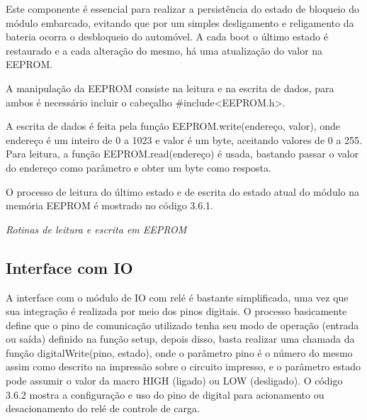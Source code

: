 Este componente é essencial para realizar a persistência do estado de bloqueio do módulo embarcado, evitando que por um simples desligamento e religamento da bateria ocorra o desbloqueio do automóvel. A cada boot o último estado é restaurado e a cada alteração do mesmo, há uma atualização do valor na EEPROM.

A manipulação da EEPROM consiste na leitura e na escrita de dados, para ambos é necessário incluir o cabeçalho \#include<EEPROM.h>. 

A escrita de dados é feita pela função EEPROM.write(endereço, valor), onde endereço é um inteiro de 0 a 1023 e valor é um byte, aceitando valores de 0 a 255. Para leitura, a função EEPROM.read(endereço) é usada, bastando passar o valor do endereço como parâmetro e obter um byte como resposta.

O processo de leitura do último estado e de escrita do estado atual do módulo na memória EEPROM é mostrado no código 3.6.1.

\renewcommand{\baselinestretch}{0.5}  %
\begin{codigo}[htb]
\fontsize{9pt}{9pt}\selectfont
      \begin{boxit}  %
      \vspace{2mm}
   \end{boxit}
   \caption{\it Rotinas de leitura e escrita em EEPROM}
   \label{code:eeprom}
\end{codigo}

\newpage

\subsection{Interface com IO}

A interface com o módulo de IO com relé é bastante simplificada, uma vez que sua integração é realizada por meio dos pinos digitais. O processo basicamente define que o pino de comunicação utilizado tenha seu modo de operação (entrada ou saída) definido na função setup, depois disso, basta realizar uma chamada da função digitalWrite(pino, estado), onde o parâmetro pino é o número do mesmo assim como descrito na impressão sobre o circuito impresso, e o parâmetro estado pode assumir o valor da macro HIGH (ligado) ou LOW (desligado). O código 3.6.2 mostra a configuração e uso do pino de digital para acionamento ou desacionamento do relé de controle de carga.

